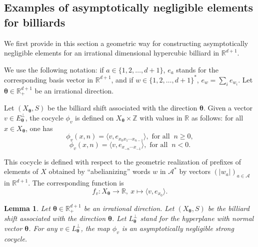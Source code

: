 \documentclass{article}
\newtheorem{lemma}{Lemma}%
\theoremstyle{definition}
\newcommand{\btheta}{\boldsymbol{\theta}}
\begin{document}
\subsection{Examples of asymptotically negligible elements for billiards} \label{subsec:an2}

We first  provide in this section  a geometric way for  constructing  asymptotically negligible elements for an irrational   dimensional hypercubic billiard in ${\mathbb R}^{d+1}$.

We use the following notation:  if $a \in \{1,2,\ldots, d+1\}$, $e_a$ stands for  the corresponding basis vector in $\mathbb R^{d+1}$, and  if $w \in  \{1,2,\ldots, d+1\}^*$, $e_w = \sum_i e_{w_i}$. %
Let $\btheta \in  {\mathbb R}^{d+1}_+$ be an irrational  direction. 

Let $ (X_{\btheta},S)$    be the billiard  shift associated with the direction $\btheta$.
Given a vector $v \in E_{\btheta}^\perp$,    the cocycle $\phi_v$ is defined   on $X_{\btheta} \times \mathbb Z$ with  values in ${\mathbb R}$  as follows:  for all $x \in X_{\btheta}$, one has 
\[
 \phi_v(x, n) = \langle v, e_{x_0 x_1 \cdots x_{n-1}} \rangle, \mbox{ for all }  \ n  \geq 0,
\]
\[
 \phi_v(x, n) = \langle v, e_{x_{-n}  \cdots x_{-1}} \rangle, \mbox{ for all } \ n  <0.\]

This cocycle is defined  with respect to the  geometric realization of  prefixes  of  elements of  $X$ obtained by ``abelianizing'' words $w$ in ${\mathcal A}^*$  by vectors $(|w_a|)_{a \in {\mathcal A}}$  in  ${\mathbb R}^{d+1}$.
The corresponding function is $$f_v:X_{\btheta} \rightarrow {\mathbb R}, \ x \mapsto  \langle v, e_{x_0}\rangle.$$

\begin{lemma} \label{lem:phiv}
Let $\btheta \in  {\mathbb R}^{d+1}_+$ be an irrational  direction. Let  $(X_{\btheta},S)$    be the billiard  shift associated with the direction $\btheta$.
Let $L_{\btheta}^\perp$ stand for the hyperplane with normal vector $\btheta$.
For any  $v \in L_{\btheta}^\perp$,  the map $\phi_v$ is an  asymptotically negligible strong cocycle.
\end{lemma}
\end{document}
